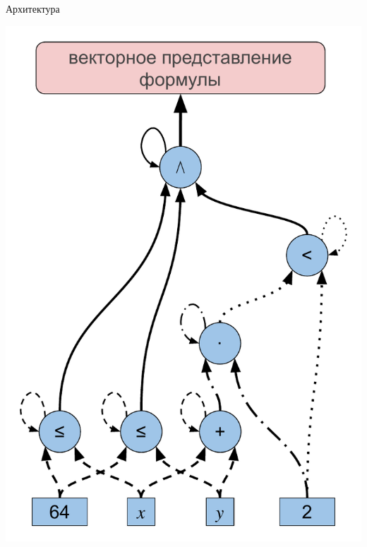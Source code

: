 \documentclass[14pt,aspectratio=169,hyperref={pdftex,unicode},xcolor=dvipsnames]{beamer}
\begin{document}
\begin{frame}{Архитектура}

\begin{minipage}{0.5\textwidth}

\begin{center}
  \includegraphics[scale=0.37]{./assets/formula-ast-talk.pdf}
\end{center}

\end{minipage}%
\begin{minipage}{0.5\textwidth}


\end{minipage}
\end{frame}
\end{document}
